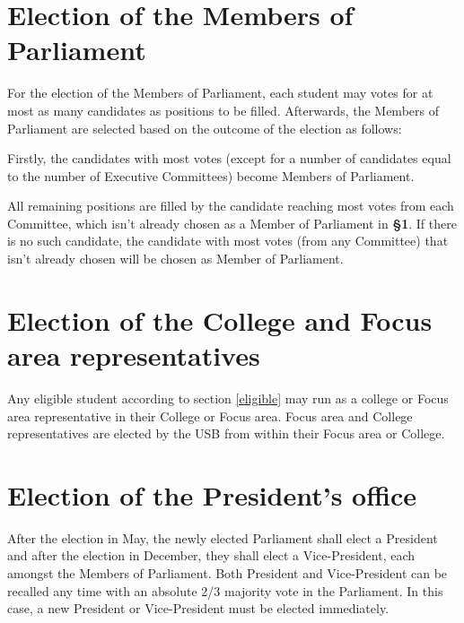 	\protect\section{Election of the Members of Parliament}\label{MPElectionDef}
	For the election of the Members of Parliament, each student may votes for at most as many candidates as positions to be filled. Afterwards, the Members of Parliament are selected based on the outcome of the election as follows:  
	\protect\begin{parenum}
		\item Firstly, the candidates with most votes (except for a number of candidates equal to the number of Executive Committees) become Members of Parliament. 
		\item All remaining positions are filled by the candidate reaching most votes from each Committee, which isn't already chosen as a Member of Parliament in \textbf{\S1}. If there is no such candidate, the candidate with most votes (from any Committee) that isn't already chosen will be chosen as Member of Parliament.
	\end{parenum}



	\protect\section{Election of the College and Focus area representatives}
	Any eligible student according to section \ref{eligible} may run as a college or Focus area representative in their College or Focus area. Focus area and College representatives are elected by the USB from within their Focus area or College.



	\protect\section{Election of the President's office}
	\label{PresiElection}
	After the election in May, the newly elected Parliament shall elect a President and after the election in December, they shall elect a Vice-President, each amongst the Members of Parliament. Both President and Vice-President can be recalled any time with an absolute 2/3 majority vote in the Parliament. In this case, a new President or Vice-President must be elected immediately.


